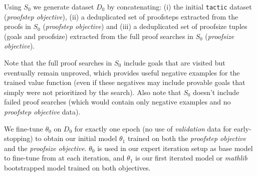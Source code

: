 \documentclass[nohyperref]{article}
\theoremstyle{plain}
\theoremstyle{definition}
\theoremstyle{remark}
\begin{document}
Using $S_0$ we generate dataset $D_0$ by concatenating: (i) the initial \texttt{tactic} dataset (\textit{proofstep objective}), (ii) a deduplicated set of proofsteps extracted from the proofs in $S_0$ (\textit{proofstep objective}) and (iii) a deduplicated set of proofsize tuples (goals and proofsize) extracted from the full proof searches in $S_0$ (\textit{proofsize objective}).

Note that the full proof searches in $S_0$ include goals that are visited but eventually remain unproved, which provides useful negative examples for the trained value function (even if these negatives may include provable goals that simply were not prioritized by the search). Also note that $S_0$ doesn't include failed proof searches (which would contain only negative examples and no \textit{proofstep objective} data).

We fine-tune $\theta_0$ on $D_0$ for exactly one epoch (no use of \textit{validation} data for early-stopping) to obtain our initial model $\theta_1$ trained on both the \textit{proofstep objective} and the \textit{proofsize objective}. $\theta_0$ is used in our expert iteration setup as base model to fine-tune from at each iteration, and $\theta_1$ is our first iterated model or \textit{mathlib} bootstrapped model trained on both objectives.
\end{document}
